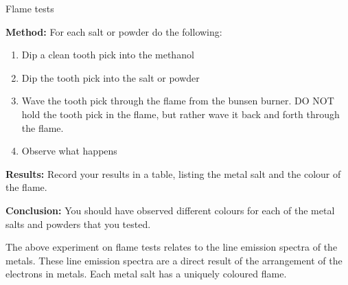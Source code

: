 \begin{i_experiment}{Flame tests}
{\label{m38741*eip-6992}\noindent{}\textbf{Method:}\newline
    For each salt or powder do the following: \label{m38741*id7092}\begin{enumerate}[noitemsep, label=\textbf{\arabic*}. ] 
            \item Dip a clean tooth pick into the methanol\item Dip the tooth pick into the salt or powder\item Wave the tooth pick through the flame from the bunsen burner. DO NOT hold the tooth pick in the flame, but rather wave it back and forth through the flame.\item Observe what happens\end{enumerate}
\par 
\label{m38741*eip-6993}\noindent{}\textbf{Results:}\newline
    Record your results in a table, listing the metal salt and the colour of the flame.
\par 
\label{m38741*eip-6994}\noindent{}\textbf{Conclusion:}\newline
    You should have observed different colours for each of the metal salts and powders that you tested.}
\end{i_experiment}
The above experiment on flame tests relates to the line emission spectra of the metals. These line emission spectra are a direct result of the arrangement of the electrons in metals. Each metal salt has a uniquely coloured flame. \par \label{m38741*secfhsst!!!underscore!!!id766}

